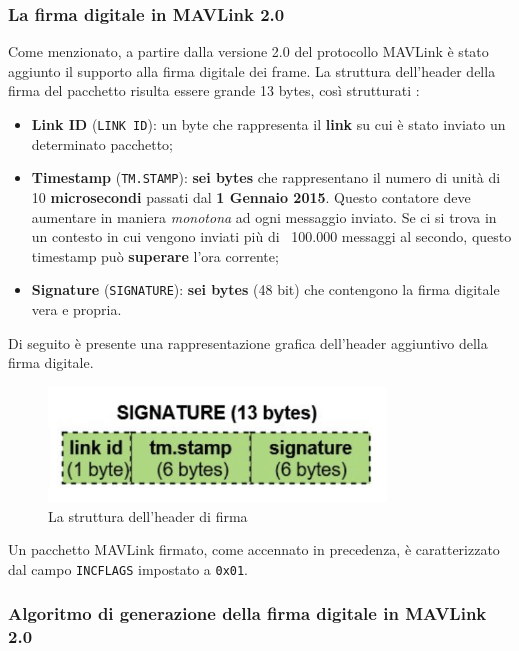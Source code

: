 \documentclass[a4paper, 12pt, oneside]{article}
\theoremstyle{definition}
\begin{document}
\subsubsection{La firma digitale in MAVLink 2.0}
Come menzionato, a partire dalla versione 2.0 del protocollo MAVLink è stato aggiunto il supporto alla firma digitale dei frame. La struttura dell'header della firma del pacchetto risulta essere grande 13 bytes, così strutturati \cite{sign-frame-fotmat}:

\begin{itemize}
    \item \textbf{Link ID} (\texttt{LINK ID}): un byte che rappresenta il \textbf{link} su cui è stato inviato un determinato pacchetto;
    \item \textbf{Timestamp} (\texttt{TM.STAMP}): \textbf{sei bytes} che rappresentano il numero di unità di 10 \textbf{microsecondi} passati dal \textbf{1 Gennaio 2015}. Questo contatore deve aumentare in maniera \textit{monotona} ad ogni messaggio inviato. Se ci si trova in un contesto in cui vengono inviati più di ~100.000 messaggi al secondo, questo timestamp può \textbf{superare} l'ora corrente;
    \item \textbf{Signature} (\texttt{SIGNATURE}): \textbf{sei bytes} (48 bit) che contengono la firma digitale vera e propria.
\end{itemize}

Di seguito è presente una rappresentazione grafica dell'header aggiuntivo della firma digitale.

\begin{figure}[H]
    \centering
    \includegraphics[width=0.8\textwidth]{images/mavlink2-signature.png}
    \caption{La struttura dell'header di firma}
\end{figure}

Un pacchetto MAVLink firmato, come accennato in precedenza, è caratterizzato dal campo \texttt{INCFLAGS} impostato a \texttt{0x01}.

\newpage

\subsubsection{Algoritmo di generazione della firma digitale in MAVLink 2.0}
\end{document}
